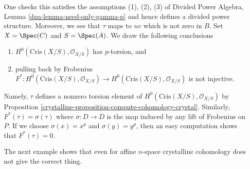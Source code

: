 \begin{example}[Torsion]
$$$$
One checks this satisfies the assumptions (1), (2), (3) of
Divided Power Algebra, Lemma \ref{dpa-lemma-need-only-gamma-p}
and hence defines a divided power structure. Moreover,
we see that $\tau$ maps to $uv$ which is not zero in $B$.
Set $X = \Spec(C)$ and $S = \Spec(A)$.
We draw the following conclusions
\begin{enumerate}
\item $H^0(\text{Cris}(X/S), \mathcal{O}_{X/S})$ has $p$-torsion, and
\item pulling back by Frobenius $F^* : H^0(\text{Cris}(X/S), \mathcal{O}_{X/S})
\to H^0(\text{Cris}(X/S), \mathcal{O}_{X/S})$ is not injective.
\end{enumerate}
Namely, $\tau$ defines a nonzero torsion element of
$H^0(\text{Cris}(X/S), \mathcal{O}_{X/S})$ by
Proposition \ref{crystalline-proposition-compute-cohomology-crystal}.
Similarly, $F^*(\tau) = \sigma(\tau)$ where $\sigma : D \to D$ is the
map induced by any lift of Frobenius on $P$. If we choose $\sigma(x) = x^p$
and $\sigma(y) = y^p$, then an easy computation shows that $F^*(\tau) = 0$.
\end{example}

The next example shows that even for affine $n$-space crystalline
cohomology does not give the correct thing.

